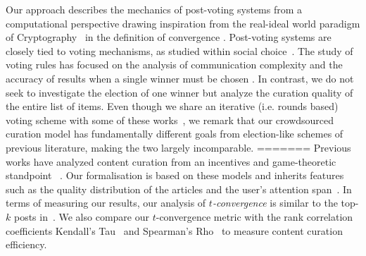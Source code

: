 Our approach  describes the mechanics of post-voting systems from a computational perspective  drawing inspiration from the real-ideal world paradigm of Cryptography~\cite{goldreich}  in the definition of convergence . 
Post-voting systems are closely tied to voting mechanisms, as studied within  social choice~\cite{lu2011robust,conitzer2005communication,xia2010compilation}. The study of voting rules has focused on the analysis of communication complexity and the accuracy of results when a single winner must be chosen . In contrast, we do not seek to investigate the election of one winner but analyze the curation quality of the entire list of items. Even though we share an iterative (i.e. rounds based) voting scheme with some of these works~\cite{kalech2011practical}, we remark that our crowdsourced curation model has fundamentally different goals from election-like schemes of previous literature, making the two largely incomparable.  
=======
Previous works have analyzed content curation from an incentives and game-theoretic standpoint~\cite{ghosh2011incentivizing,das2010ranking,gupte2009news,may2014filter,abbassi2014distributed} . Our formalisation is based on these models and inherits features such as the quality distribution of the articles and the user's attention span~\cite{askalidis2013theoretical,ghosh2011incentivizing}. In terms of measuring our results, our analysis of \textit{$t$-convergence} is similar to the top-$k$ posts in~\cite{askalidis2013theoretical}. We also compare our $t$-convergence metric with the rank correlation coefficients Kendall's Tau~\cite{kendall1955rank} and Spearman's Rho~\cite{spearman1904proof} to measure content curation efficiency.

